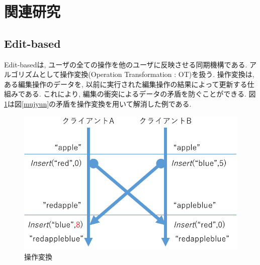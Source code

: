 \section{関連研究}
%
\subsection{Edit-based}
Edit-basedは, ユーザの全ての操作を他のユーザに反映させる同期機構である.
アルゴリズムとして操作変換(Operation Transformation : OT)\cite{OT}を扱う.
操作変換は, ある編集操作のデータを, 以前に実行された編集操作の結果によって更新する仕組みである.
これにより, 編集の衝突によるデータの矛盾を防ぐことができる.
図\ref{ot}は図\ref{mujyun}の矛盾を操作変換を用いて解消した例である.
\begin{figure}[htbp]
  \begin{center}
    \includegraphics[scale=0.3]{images/ot}
    \caption{操作変換}
    \label{ot}
  \end{center}
\end{figure}
%
